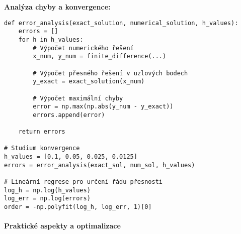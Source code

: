 \begin{example}
\vspace{1\baselineskip}

\noindent\textbf{Analýza chyby a konvergence:}
\begin{verbatim}
def error_analysis(exact_solution, numerical_solution, h_values):
    errors = []
    for h in h_values:
        # Výpočet numerického řešení
        x_num, y_num = finite_difference(...)
        
        # Výpočet přesného řešení v uzlových bodech
        y_exact = exact_solution(x_num)
        
        # Výpočet maximální chyby
        error = np.max(np.abs(y_num - y_exact))
        errors.append(error)
    
    return errors

# Studium konvergence
h_values = [0.1, 0.05, 0.025, 0.0125]
errors = error_analysis(exact_sol, num_sol, h_values)

# Lineární regrese pro určení řádu přesnosti
log_h = np.log(h_values)
log_err = np.log(errors)
order = -np.polyfit(log_h, log_err, 1)[0]
\end{verbatim}

\end{example}

\paragraph{Praktické aspekty a optimalizace}

